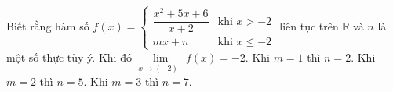 \begin{ex}
Biết rằng hàm số $f(x)=\begin{cases}\dfrac{x^2+5x+6}{x+2}&\text{khi }x>-2\\mx+n&\text{khi }x\le-2\end{cases}$ liên tục trên $\mathbb R$ và $n$ là một số thực tùy ý. Khi đó
\choiceTF
{$\lim\limits_{x\to(-2)^+}f(x)=-2$.}
{Khi $m=1$ thì $n=2$.}
{\True Khi $m=2$ thì $n=5$.}
{\True Khi $m=3$ thì $n=7$.}
\end{ex}
